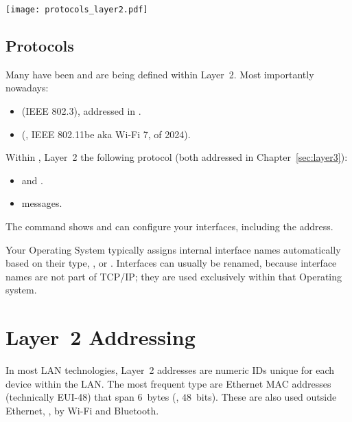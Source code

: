 \vspace{-0.3cm}
\begin{center}
\texttt{[image: protocols\_layer2.pdf]}
\end{center}
\vspace{-0.5cm}

\subsection*{Protocols}
Many  have been and are being defined within Layer~2. Most importantly nowadays:\\[-0.65cm]
\begin{itemize}
\item {} (IEEE 802.3), addressed in .
\item {} (\eg, IEEE 802.11be aka Wi-Fi 7, of 2024).
\end{itemize}

Within , Layer~2  the following protocol 
(both addressed in Chapter~\ref{sec:layer3}):\\[-0.65cm]
\begin{itemize}
  \item {} and  .
  \item {} messages.\\[-0.75cm]
\end{itemize}

\vspace{0.5cm}

\begin{remark}
The  command shows and can configure your interfaces,
including the  address.

Your Operating System typically assigns internal interface names automatically based on their type,
\eg,  or .
% 
Interfaces can usually be renamed, because interface names 
are not part of TCP/IP; they are used exclusively within that Operating system.
\end{remark}


\section{Layer~2 Addressing}
In most LAN technologies, Layer~2 addresses are numeric IDs unique for each device within the LAN. 
The most frequent type are Ethernet MAC addresses (technically EUI-48) that span $6$~bytes (\ie, $48$~bits).
These are also used outside Ethernet, \eg, by Wi-Fi and Bluetooth.

